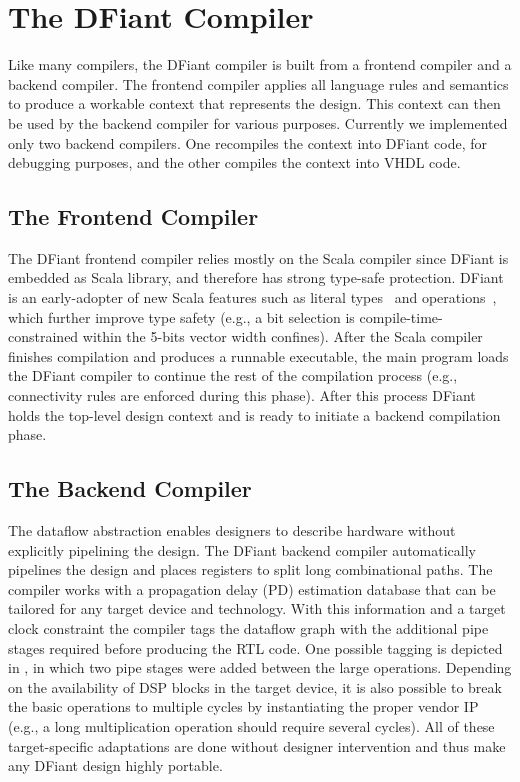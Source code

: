 \section{The DFiant Compiler}
\label{sec:compiler}
Like many compilers, the DFiant compiler is built from a frontend compiler and a backend compiler. The frontend compiler applies all language rules and semantics to produce a workable context that represents the design. This context can then be used by the backend compiler for various purposes. Currently we implemented only two backend compilers. One recompiles the context into DFiant code, for debugging purposes, and the other compiles the context into VHDL code.

\subsection{The Frontend Compiler}
The DFiant frontend compiler relies mostly on the Scala compiler since DFiant is embedded as Scala library, and therefore has strong type-safe protection. DFiant is an early-adopter of new Scala features such as literal types~\cite{TypeLevelScala} and operations~\cite{singleton-ops}, which further improve type safety (e.g., a  bit selection is compile-time-constrained within the 5-bits vector width confines). After the Scala compiler finishes compilation and produces a runnable executable, the main program loads the DFiant compiler to continue the rest of the compilation process (e.g., connectivity rules are enforced during this phase). After this process DFiant holds the top-level design context and is ready to initiate a backend compilation phase. 

\subsection{The Backend Compiler}

The dataflow abstraction enables designers to describe hardware without explicitly pipelining the design. The DFiant backend compiler automatically pipelines the design and places registers to split long combinational paths. The compiler works with a propagation delay (PD) estimation database that can be tailored for any target device and technology. With this information and a target clock constraint the compiler tags the dataflow graph with the additional pipe stages required before producing the RTL code. One possible tagging is depicted in , in which two pipe stages were added between the large operations. Depending on the availability of DSP blocks in the target device, it is also possible to break the basic operations to multiple cycles by instantiating the proper vendor IP (e.g., a long multiplication operation should require several cycles). All of these target-specific adaptations are done without designer intervention and thus make any DFiant design highly portable.

